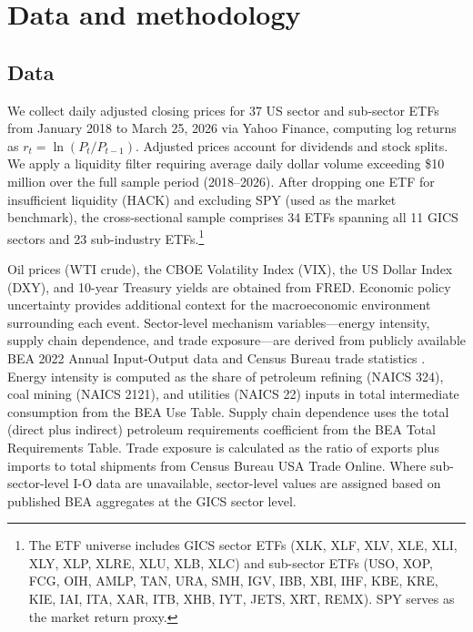 \documentclass[12pt,preprint,authoryear]{elsarticle}
\begin{document}
\section{Data and methodology}\label{sec:data}

\subsection{Data}
We collect daily adjusted closing prices for 37 US sector and sub-sector ETFs from January 2018 to March 25, 2026 via Yahoo Finance, computing log returns as $r_t = \ln(P_t / P_{t-1})$. Adjusted prices account for dividends and stock splits. We apply a liquidity filter requiring average daily dollar volume exceeding \$10 million over the full sample period (2018--2026). After dropping one ETF for insufficient liquidity (HACK) and excluding SPY (used as the market benchmark), the cross-sectional sample comprises 34 ETFs spanning all 11 GICS sectors and 23 sub-industry ETFs.\footnote{The ETF universe includes GICS sector ETFs (XLK, XLF, XLV, XLE, XLI, XLY, XLP, XLRE, XLU, XLB, XLC) and sub-sector ETFs (USO, XOP, FCG, OIH, AMLP, TAN, URA, SMH, IGV, IBB, XBI, IHF, KBE, KRE, KIE, IAI, ITA, XAR, ITB, XHB, IYT, JETS, XRT, REMX). SPY serves as the market return proxy.}

Oil prices (WTI crude), the CBOE Volatility Index (VIX), the US Dollar Index (DXY), and 10-year Treasury yields are obtained from FRED. Economic policy uncertainty \citep{baker2016measuring} provides additional context for the macroeconomic environment surrounding each event. Sector-level mechanism variables---energy intensity, supply chain dependence, and trade exposure---are derived from publicly available BEA 2022 Annual Input-Output data and Census Bureau trade statistics \citep{bea2022io}. Energy intensity is computed as the share of petroleum refining (NAICS 324), coal mining (NAICS 2121), and utilities (NAICS 22) inputs in total intermediate consumption from the BEA Use Table. Supply chain dependence uses the total (direct plus indirect) petroleum requirements coefficient from the BEA Total Requirements Table. Trade exposure is calculated as the ratio of exports plus imports to total shipments from Census Bureau USA Trade Online. Where sub-sector-level I-O data are unavailable, sector-level values are assigned based on published BEA aggregates at the GICS sector level.
\end{document}

